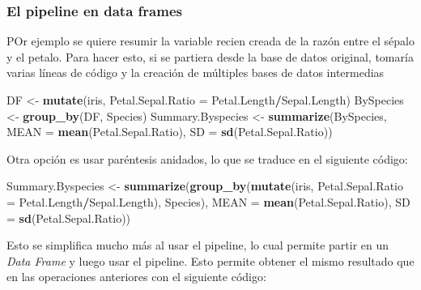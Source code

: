 \documentclass[]{book}
\newenvironment{Shaded}{\begin{snugshade}}{\end{snugshade}}
\newcommand{\DataTypeTok}[1]{\textcolor[rgb]{0.13,0.29,0.53}{#1}}
\newcommand{\KeywordTok}[1]{\textcolor[rgb]{0.13,0.29,0.53}{\textbf{#1}}}
\newcommand{\NormalTok}[1]{#1}
\newcommand{\OperatorTok}[1]{\textcolor[rgb]{0.81,0.36,0.00}{\textbf{#1}}}
\newcommand{\StringTok}[1]{\textcolor[rgb]{0.31,0.60,0.02}{#1}}
\begin{document}
\hypertarget{el-pipeline-en-data-frames}{%
\subsubsection{El pipeline en data
frames}\label{el-pipeline-en-data-frames}}

POr ejemplo se quiere resumir la variable recien creada de la razón
entre el sépalo y el petalo. Para hacer esto, si se partiera desde la
base de datos original, tomaría varias líneas de código y la creación de
múltiples bases de datos intermedias

\begin{Shaded}
\begin{Highlighting}[]
\NormalTok{DF <-}\StringTok{ }\KeywordTok{mutate}\NormalTok{(iris, }\DataTypeTok{Petal.Sepal.Ratio =}\NormalTok{ Petal.Length}\OperatorTok{/}\NormalTok{Sepal.Length)}
\NormalTok{BySpecies <-}\StringTok{ }\KeywordTok{group_by}\NormalTok{(DF, Species)}
\NormalTok{Summary.Byspecies <-}\StringTok{ }\KeywordTok{summarize}\NormalTok{(BySpecies, }\DataTypeTok{MEAN =} \KeywordTok{mean}\NormalTok{(Petal.Sepal.Ratio), }
    \DataTypeTok{SD =} \KeywordTok{sd}\NormalTok{(Petal.Sepal.Ratio))}
\end{Highlighting}
\end{Shaded}

Otra opción es usar paréntesis anidados, lo que se traduce en el
siguiente código:

\begin{Shaded}
\begin{Highlighting}[]
\NormalTok{Summary.Byspecies <-}\StringTok{ }\KeywordTok{summarize}\NormalTok{(}\KeywordTok{group_by}\NormalTok{(}\KeywordTok{mutate}\NormalTok{(iris, }\DataTypeTok{Petal.Sepal.Ratio =}\NormalTok{ Petal.Length}\OperatorTok{/}\NormalTok{Sepal.Length), }
\NormalTok{    Species), }\DataTypeTok{MEAN =} \KeywordTok{mean}\NormalTok{(Petal.Sepal.Ratio), }\DataTypeTok{SD =} \KeywordTok{sd}\NormalTok{(Petal.Sepal.Ratio))}
\end{Highlighting}
\end{Shaded}

Esto se simplifica mucho más al usar el pipeline, lo cual permite partir
en un \emph{Data Frame} y luego usar el pipeline. Esto permite obtener
el mismo resultado que en las operaciones anteriores con el siguiente
código:

\begin{Shaded}
\end{Shaded}
\end{document}
